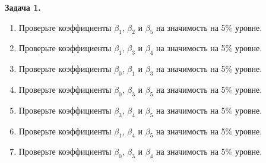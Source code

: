 \documentclass[10pt, a4paper]{extarticle}
\begin{document}
	{\Large \textbf{Задача 1.}}
	
	\begin{enumerate}[label=\alph*)]
		\item Проверьте коэффициенты $\beta_1$, $\beta_2$ и $\beta_5$ на значимость на 5\% уровне.
		\item Проверьте коэффициенты $\beta_1$, $\beta_3$ и $\beta_4$ на значимость на 5\% уровне.
		\item Проверьте коэффициенты $\beta_0$, $\beta_1$ и $\beta_3$ на значимость на 5\% уровне.
		\item Проверьте коэффициенты $\beta_0$, $\beta_3$ и $\beta_5$ на значимость на 5\% уровне.
		\item Проверьте коэффициенты $\beta_3$, $\beta_4$ и $\beta_5$ на значимость на 5\% уровне.
		\item Проверьте коэффициенты $\beta_1$, $\beta_4$ и $\beta_5$ на значимость на 5\% уровне.
		\item Проверьте коэффициенты $\beta_0$, $\beta_3$ и $\beta_4$ на значимость на 5\% уровне.
	\end{enumerate}
	\vspace{1em}
		
\end{document}
